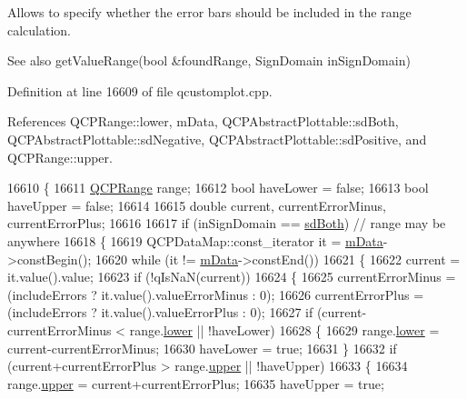 Allows to specify whether the error bars should be included in the range calculation.

\begin{DoxySeeAlso}{See also}
get\+Value\+Range(bool \&found\+Range, Sign\+Domain in\+Sign\+Domain) 
\end{DoxySeeAlso}


Definition at line 16609 of file qcustomplot.\+cpp.



References Q\+C\+P\+Range\+::lower, m\+Data, Q\+C\+P\+Abstract\+Plottable\+::sd\+Both, Q\+C\+P\+Abstract\+Plottable\+::sd\+Negative, Q\+C\+P\+Abstract\+Plottable\+::sd\+Positive, and Q\+C\+P\+Range\+::upper.


\begin{DoxyCode}
16610 \{
16611   \hyperlink{class_q_c_p_range}{QCPRange} range;
16612   \textcolor{keywordtype}{bool} haveLower = \textcolor{keyword}{false};
16613   \textcolor{keywordtype}{bool} haveUpper = \textcolor{keyword}{false};
16614   
16615   \textcolor{keywordtype}{double} current, currentErrorMinus, currentErrorPlus;
16616   
16617   \textcolor{keywordflow}{if} (inSignDomain == \hyperlink{class_q_c_p_abstract_plottable_a661743478a1d3c09d28ec2711d7653d8a082b98cfb91a7363a3b5cd17b0c1cd60}{sdBoth}) \textcolor{comment}{// range may be anywhere}
16618   \{
16619     QCPDataMap::const\_iterator it = \hyperlink{class_q_c_p_graph_a8457c840f69a0ac49f61d30a509c5d08}{mData}->constBegin();
16620     \textcolor{keywordflow}{while} (it != \hyperlink{class_q_c_p_graph_a8457c840f69a0ac49f61d30a509c5d08}{mData}->constEnd())
16621     \{
16622       current = it.value().value;
16623       \textcolor{keywordflow}{if} (!qIsNaN(current))
16624       \{
16625         currentErrorMinus = (includeErrors ? it.value().valueErrorMinus : 0);
16626         currentErrorPlus = (includeErrors ? it.value().valueErrorPlus : 0);
16627         \textcolor{keywordflow}{if} (current-currentErrorMinus < range.\hyperlink{class_q_c_p_range_aa3aca3edb14f7ca0c85d912647b91745}{lower} || !haveLower)
16628         \{
16629           range.\hyperlink{class_q_c_p_range_aa3aca3edb14f7ca0c85d912647b91745}{lower} = current-currentErrorMinus;
16630           haveLower = \textcolor{keyword}{true};
16631         \}
16632         \textcolor{keywordflow}{if} (current+currentErrorPlus > range.\hyperlink{class_q_c_p_range_ae44eb3aafe1d0e2ed34b499b6d2e074f}{upper} || !haveUpper)
16633         \{
16634           range.\hyperlink{class_q_c_p_range_ae44eb3aafe1d0e2ed34b499b6d2e074f}{upper} = current+currentErrorPlus;
16635           haveUpper = \textcolor{keyword}{true};

\end{DoxyCode}
